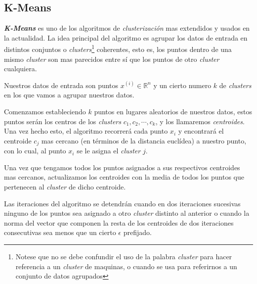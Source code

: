 \subsection{K-Means}
\textbf{\textit{K-Means}} es uno de los algoritmos de \textit{clusterización} mas 
extendidos y usados en la actualidad. La idea principal del algoritmo es agrupar los datos de entrada 
en distintos conjuntos o \textit{clusters}\footnote{Notese que no se debe confundir el uso de la 
palabra \textit{cluster} para hacer referencia a un \textit{cluster} de maquinas, o cuando se usa 
para referirnos a un conjunto de datos agrupados} 
coherentes, esto es, los puntos dentro de una mismo \textit{cluster} son mas parecidos entre sí 
que los puntos de otro \textit{cluster} cualquiera.
\newline

Nuestros datos de entrada son puntos $x^{(i)} \in \mathds{R}^n$ y un cierto numero $k$ de 
\textit{clusters} en los que vamos a agrupar nuestros datos.

Comenzamos estableciendo $k$ puntos en lugares aleatorios de nuestros datos, estos puntos serán los 
centros de los \textit{clusters} $c_1, c_2, \cdots, c_k$, y los llamaremos \textit{centroides}.
Una vez hecho esto, el algoritmo recorrerá cada punto $x_i$ y encontrará el centroide $c_j$ mas 
cercano (en términos de la distancia euclídea) a nuestro punto, con lo cual, al punto $x_i$ se le 
asigna el \textit{cluster} $j$.

Una vez que tengamos todos los puntos asignados a sus respectivos centroides mas cercanos, actualizamos 
los centroides con la media de todos los puntos que pertenecen al \textit{cluster} de dicho centroide.

Las iteraciones del algoritmo se detendrán cuando en dos iteraciones sucesivas ninguno de los puntos 
sea asignado a otro \textit{cluster} distinto al anterior o cuando la norma del vector que componen 
la resta de los centroides de dos iteraciones consecutivas sea menos que un cierto $\epsilon$ 
prefijado.
\newline

